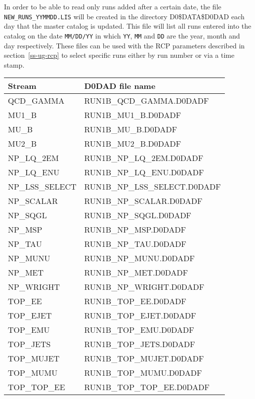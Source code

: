 \par
In order to be able to read only runs added after a certain
date, the file {\tt NEW\_RUNS\_YYMMDD.LIS} will be created
in the directory D0\$DATA\$D0DAD each day that
the master catalog is updated.  This file will list all runs entered into the
catalog on the date {\tt MM/DD/YY} in which {\tt YY}, {\tt MM} and {\tt DD}
are the year, month and day respectively.  These files can be used with the
RCP parameters described in section~\ref{ss-ug-rcp} to select specific runs 
either by run number or via a time stamp.
{\tiny
\begin{table}
  \begin{center}
  \begin{tabular}{|l|l|}\hline
     {\small \bf Stream} & {\small \bf D0DAD file name} \\
    \hline
      QCD\_GAMMA 	& RUN1B\_QCD\_GAMMA.D0DADF \\
      MU1\_B      	& RUN1B\_MU1\_B.D0DADF \\
      MU\_B      	& RUN1B\_MU\_B.D0DADF \\
      MU2\_B     	& RUN1B\_MU2\_B.D0DADF \\
      NP\_LQ\_2EM 	& RUN1B\_NP\_LQ\_2EM.D0DADF \\
      NP\_LQ\_ENU 	& RUN1B\_NP\_LQ\_ENU.D0DADF \\
      NP\_LSS\_SELECT 	& RUN1B\_NP\_LSS\_SELECT.D0DADF \\
      NP\_SCALAR     	& RUN1B\_NP\_SCALAR.D0DADF \\
      NP\_SQGL 		& RUN1B\_NP\_SQGL.D0DADF \\
      NP\_MSP 		& RUN1B\_NP\_MSP.D0DADF \\
      NP\_TAU	 	& RUN1B\_NP\_TAU.D0DADF \\
      NP\_MUNU 		& RUN1B\_NP\_MUNU.D0DADF \\
      NP\_MET 		& RUN1B\_NP\_MET.D0DADF \\
      NP\_WRIGHT 	& RUN1B\_NP\_WRIGHT.D0DADF \\
      TOP\_EE 		& RUN1B\_TOP\_EE.D0DADF \\
      TOP\_EJET 	& RUN1B\_TOP\_EJET.D0DADF \\
      TOP\_EMU 		& RUN1B\_TOP\_EMU.D0DADF \\
      TOP\_JETS 	& RUN1B\_TOP\_JETS.D0DADF \\
      TOP\_MUJET 	& RUN1B\_TOP\_MUJET.D0DADF \\
      TOP\_MUMU 	& RUN1B\_TOP\_MUMU.D0DADF \\
      TOP\_TOP\_EE 	& RUN1B\_TOP\_TOP\_EE.D0DADF \\

\end{tabular}
\end{center}
\end{table}}
